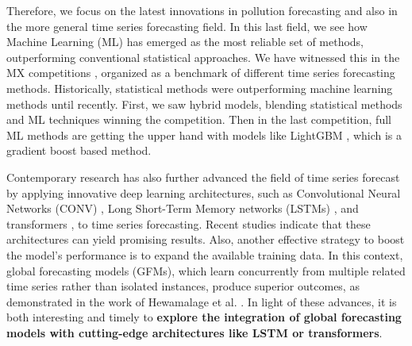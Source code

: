 \documentclass[12pt,a4paper]{book}
\begin{document}
Therefore, we focus on the latest innovations in pollution forecasting and also in the more general time series forecasting field. In this last field, we see how Machine Learning (ML) has emerged as the most reliable set of methods, outperforming conventional statistical approaches. We have witnessed this in the MX competitions \citep[e.g. ][]{makridakis_m3-competition:_2000,makridakis_m4_2020,makridakis_m5_2022}, organized as a benchmark of different time series forecasting methods. Historically, statistical methods were outperforming machine learning methods until recently. First, we saw hybrid models, blending statistical methods and ML techniques winning the competition. Then in the last competition, full ML methods are getting the upper hand with models like LightGBM \citep{NIPS2017_6449f44a}, which is a gradient boost based method.

Contemporary research has also further advanced the field of time series forecast by applying innovative deep learning architectures, such as Convolutional Neural Networks (CONV) \citep{lecun_convolutional_1998}, Long Short-Term Memory networks (LSTMs) \citep{lstmhochreiter1997long}, and transformers \citep{transvaswani_attention_2023}, to time series forecasting. Recent studies \citep{masood_review_2021} indicate that these architectures can yield promising results. Also, another effective strategy to boost the model's performance is to expand the available training data. In this context, global forecasting models (GFMs), which learn concurrently from multiple related time series rather than isolated instances, produce superior outcomes, as demonstrated in the work of Hewamalage et al. \citep{hewamalage_advancing_2022}. In light of these advances, it is both interesting and timely to \textbf{explore the integration of global forecasting models with cutting-edge architectures like LSTM or transformers}. 
\end{document}

